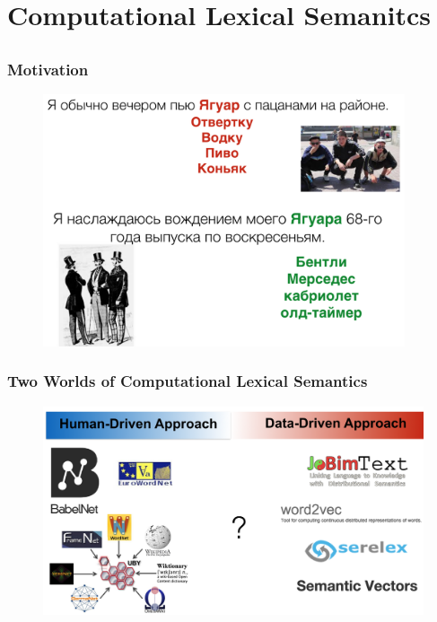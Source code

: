 
\section[Lexical Semantics]{Computational Lexical Semanitcs}
\subsection{ }



\begin{frame}
\frametitle{Motivation}


\begin{figure}
\centering
\includegraphics[width=0.95\textwidth]{./figures/jaguar}
\end{figure} 
\end{frame}


\begin{frame}
\frametitle{Two Worlds of Computational Lexical Semantics}


\begin{figure}
\centering
\includegraphics[width=1.0\textwidth]{./figures/two-worlds}
\end{figure} 
\end{frame}





